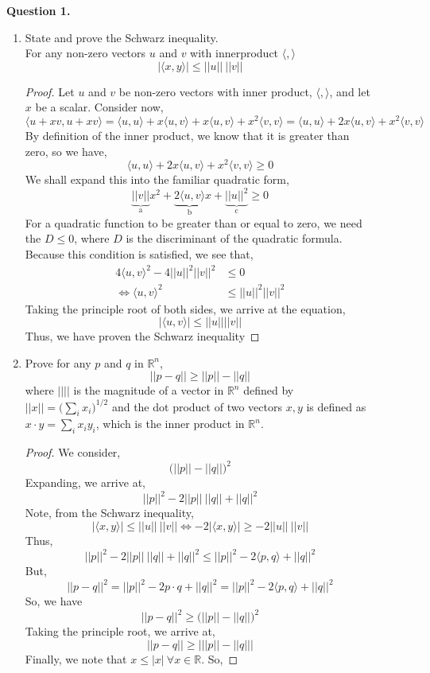 \documentclass[letterpaper,10pt]{article}
\newcommand{\R}{\mathbb{R}}
\newcommand{\inner}[2]{\langle #1,#2\rangle}
\begin{document}
\begin{description}
\item[] \textbf{Question 1.}
\begin{enumerate}[label=\alph*.]
\item State and prove the Schwarz inequality.\\
For any non-zero vectors $u$ and $v$ with innerproduct $\inner{}{}$
\[|\inner{x}{y}|\leq||u||\ ||v||\]
\begin{proof}
Let $u$ and $v$ be non-zero vectors with inner product, $\inner{}{}$, and let $x$ be a scalar. Consider now,
\[\inner{u+xv}{u+xv}=\inner{u}{u}+x\inner{u}{v}+x\inner{u}{v}+x^2\inner{v}{v}=\inner{u}{u}+2x\inner{u}{v}+x^2\inner{v}{v}\]
By definition of the inner product, we know that it is greater than zero, so we have,
\[\inner{u}{u}+2x\inner{u}{v}+x^2\inner{v}{v}\geq 0\]
We shall expand this into the familiar quadratic form,
\[\underbrace{||v||}_{\text{a}}x^2+\underbrace{2\inner{u}{v}}_{\text{b}}x+\underbrace{||u||^2}_{\text{c}}\geq 0\]
For a quadratic function to be greater than or equal to zero, we need the $D\leq 0$, where $D$ is the discriminant of the quadratic formula. Because this condition is satisfied, we see that,
\begin{align*}
4\inner{u}{v}^2-4||u||^2||v||^2 &\leq 0\\
\Leftrightarrow \inner{u}{v}^2 &\leq ||u||^2||v||^2
\end{align*}
Taking the principle root of both sides, we arrive at the equation,
\[|\inner{u}{v}|\leq ||u||||v||\]
Thus, we have proven the Schwarz inequality
\end{proof}
\item Prove for any $p$ and $q$ in $\R^n$,
\[||p-q||\geq ||p||-||q||\]
where $||||$ is the magnitude of a vector in $\R^n$ defined by $||x||=\bigg(\sum_{i}x_i\bigg)^{1/2}$ and the dot product of two vectors $x,y$ is defined as $x\cdot y=\sum_ix_iy_i$, which is the inner product in $\R^n$.
\begin{proof}
We consider,
\[\big(||p||-||q||\big)^2\]
Expanding, we arrive at,
\[||p||^2-2||p||\ ||q||+||q||^2\]
Note, from the Schwarz inequality,
\[|\inner{x}{y}|\leq||u||\ ||v|| \Leftrightarrow -2|\inner{x}{y}|\geq -2||u||\ ||v||\]
Thus,
\[||p||^2-2||p||\ ||q||+||q||^2 \leq ||p||^2-2\inner{p}{q}+||q||^2\]
But,
\[||p-q||^2 = ||p||^2-2 p\cdot q +||q||^2=||p||^2-2\inner{p}{q}+||q||^2\]
So, we have
\[||p-q||^2\geq\big(||p||-||q||\big)^2\]
Taking the principle root, we arrive at,
\[||p-q||\geq\big|||p||-||q||\big|\]
Finally, we note that $x\leq|x|\ \forall x\in \R$. So,

\end{proof}
\end{enumerate}
\end{description}
\end{document}
